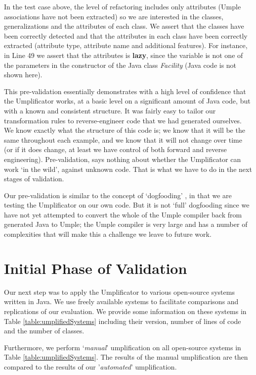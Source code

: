 In the test case above, the level of refactoring includes only attributes (Umple associations have not been extracted) so we are interested in the classes, generalizations and the attributes of each class. We assert that the classes have been correctly detected and that the attributes in each class have been correctly extracted (attribute type, attribute name and additional features). For instance, in Line 49 we assert that the attributes is \textbf{lazy}, since the variable is not one of the parameters in the constructor of the Java class \textit{Facility} (Java code is not shown here).

This pre-validation essentially demonstrates with a high level of confidence that the Umplificator works, at a basic level on a significant amount of Java code, but with a known and consistent structure. It was fairly easy to tailor our transformation rules to reverse-engineer code that we had generated ourselves. We know exactly what the structure of this code is; we know that it will be the same throughout each example, and we know that it will not change over time (or if it does change, at least we have control of both forward and reverse engineering). Pre-validation, says nothing about whether the Umplificator can work `in the wild', against unknown code. That is what we have to do in the next stages of validation.

Our pre-validation is similar to the concept of `dogfooding' \cite{ash2003web}, in that we are testing the Umplificator on our own code. But it is not `full' dogfooding since we have not yet attempted to convert the whole of the Umple compiler back from generated Java to Umple; the Umple compiler is very large and has a number of complexities that will make this a challenge we leave to future work.


\section{Initial Phase of Validation}

Our next step was to apply the Umplificator to various open-source systems written in Java. We use freely available systems to facilitate comparisons and replications of our evaluation. We provide some information on these systems in Table \ref{table:umplifiedSystems} including their version, number of lines of code and the number of classes.

Furthermore, we perform `\textit{manual}' umplification on all open-source systems in Table \ref{table:umplifiedSystems}. The results of the manual umplification are then compared to the results of our '\textit{automated}' umplification. 

